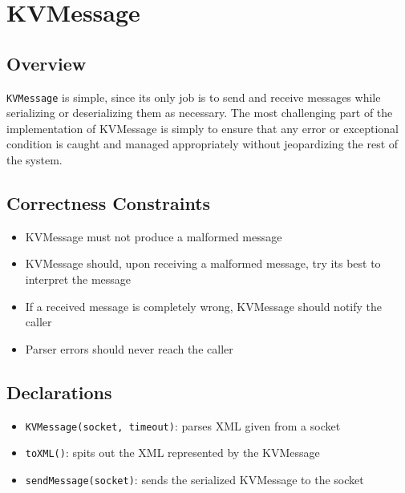 \section{KVMessage}
\subsection{Overview}
\texttt{KVMessage} is simple, since its only job is to send and receive messages while serializing or deserializing them as necessary. The most challenging part of the implementation of KVMessage is simply to ensure that any error or exceptional condition is caught and managed appropriately without jeopardizing the rest of the system.
\subsection{Correctness Constraints}
\begin{itemize}
\item KVMessage must not produce a malformed message
\item KVMessage should, upon receiving a malformed message, try its best to interpret the message
\item If a received message is completely wrong, KVMessage should notify the caller
\item Parser errors should never reach the caller
\end{itemize}
\subsection{Declarations}
\begin{itemize}
\item \texttt{KVMessage(socket, timeout)}: parses XML given from a socket
\item \texttt{toXML()}: spits out the XML represented by the KVMessage
\item \texttt{sendMessage(socket)}: sends the serialized KVMessage to the socket
\end{itemize}
